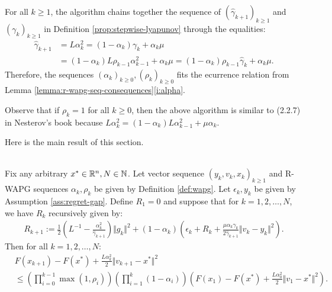 \documentclass[12pt]{article}
\begin{document}
    \begin{remark}\label{remark:rwapg-def}
        For all $k \ge 1$, the algorithm chains together the sequence of $(\hat \gamma_{k+1})_{k \ge 1}$ and $(\gamma_k)_{k \ge 1}$ in Definition \ref{prop:stepwise-lyapunov} through the equalities:
        \begin{align*}
            \hat \gamma_{k + 1}
            &= L\alpha_k^2
            = (1 - \alpha_k)\gamma_k + \alpha_k \mu
            \\
            &= (1 - \alpha_k)L\rho_{k - 1}\alpha_{k - 1}^2 + \alpha_k \mu
            = (1 - \alpha_k)\rho_{k - 1}\hat \gamma_{k} + \alpha_k \mu.
        \end{align*}
        Therefore, the sequences $(\alpha_k)_{k \ge 0}, (\rho_k)_{k \ge 0}$ fits the ecurrence relation from Lemma \ref{lemma:r-wapg-seq-consequences}\ref{i:alpha}.
        \par
        Observe that if $\rho_k = 1$ for all $k\ge 0$, then the above algorithm is similar to (2.2.7) in Nesterov's book \cite{nesterov_lectures_2018} because $L\alpha_k^{2} = (1 - \alpha_k)L\alpha_{k - 1}^2 + \mu \alpha_k$.
    \end{remark}
    Here is the main result of this section.
    \begin{proposition}\label{prop:wapg-convergence}\; \\
        Fix any arbitrary $x^* \in \mathbb R^n, N \in \mathbb N$.
        Let vector sequence $(y_k, v_{k}, x_{k})_{k \ge 1}$ and R-WAPG sequences $\alpha_k, \rho_k$ be given by Definition \ref{def:wapg}.
        Let $\epsilon_k, y_k$ be given by Assumption \ref{ass:regret-gap}.
        Define $R_1 = 0$ and suppose that for $k = 1, 2, \ldots, N$, we have $R_k$ recursively given by:
        \begin{align*}
            R_{k + 1}
            :=
            \frac{1}{2}\left(
                L^{-1} - \frac{\alpha_k^2}{\hat \gamma_{k + 1}}
            \right)\Vert g_k\Vert^2
            +
            (1 - \alpha_k)
            \left(
                \epsilon_k + R_k +
                \frac{\mu\alpha_k\gamma_k}{2\hat \gamma_{k + 1}}
                \Vert v_k - y_k\Vert^2
            \right).
        \end{align*}
        Then for all $k = 1, 2, \ldots, N$:
        \begin{align*}
            & F(x_{k + 1}) - F(x^*) + \frac{L \alpha_k^2}{2}\Vert v_{k + 1} - x^*\Vert^2
            \\
            &\le
            \left(
                \prod_{i = 0}^{k - 1} \max(1, \rho_{i})
            \right)
            \left(
                \prod_{i = 1}^{k} \left(1  - \alpha_i\right)
            \right)
            \left(
                F(x_1) - F(x^*) + \frac{L\alpha_0^2}{2}\Vert v_1 - x^*\Vert^2
            \right).
        \end{align*}
    \end{proposition}
\end{document}
